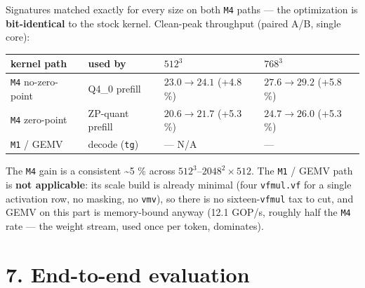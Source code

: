 \documentclass[
]{article}
\newcounter{none} %
\begin{document}
Signatures matched exactly for every size on both \texttt{M4} paths ---
the optimization is \textbf{bit-identical} to the stock kernel.
Clean-peak throughput (paired A/B, single core):

{\def\LTcaptype{none} %
\begin{longtable}[]{@{}
  >{\raggedright\arraybackslash}p{}
  >{\raggedright\arraybackslash}p{}
  >{\raggedleft\arraybackslash}p{}
  >{\raggedleft\arraybackslash}p{}@{}}
\toprule\noalign{}
\begin{minipage}[b]{\linewidth}\raggedright
kernel path
\end{minipage} & \begin{minipage}[b]{\linewidth}\raggedright
used by
\end{minipage} & \begin{minipage}[b]{\linewidth}\raggedleft
\(512^3\)
\end{minipage} & \begin{minipage}[b]{\linewidth}\raggedleft
\(768^3\)
\end{minipage} \\
\midrule\noalign{}
\endhead
\bottomrule\noalign{}
\endlastfoot
\texttt{M4} no-zero-point & Q4\_0 prefill & \(23.0\to24.1\) (+4.8 \%) &
\(27.6\to29.2\) (+5.8 \%) \\
\texttt{M4} zero-point & ZP-quant prefill & \(20.6\to21.7\) (+5.3 \%) &
\(24.7\to26.0\) (+5.3 \%) \\
\texttt{M1} / GEMV & decode (\texttt{tg}) & 12.1 --- N/A & --- \\
\end{longtable}
}

The \texttt{M4} gain is a consistent \textasciitilde5 \% across
\(512^3\)--\(2048^2\times512\). The \texttt{M1} / GEMV path is
\textbf{not applicable}: its scale build is already minimal (four
\texttt{vfmul.vf} for a single activation row, no masking, no
\texttt{vmv}), so there is no sixteen-\texttt{vfmul} tax to cut, and
GEMV on this part is memory-bound anyway (12.1 GOP/s, roughly half the
\texttt{M4} rate --- the weight stream, used once per token, dominates).

\section{7. End-to-end evaluation}\label{end-to-end-evaluation}
\end{document}
